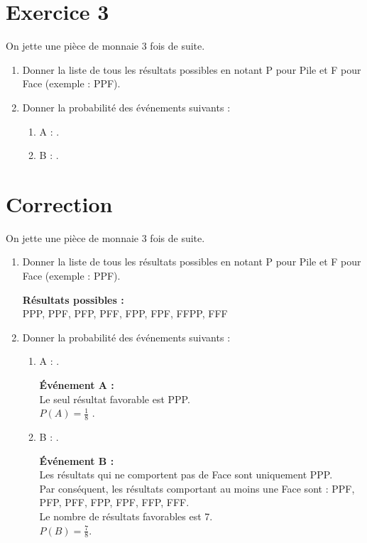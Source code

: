 \documentclass{article}
\begin{document}
\section*{Exercice 3}

On jette une pièce de monnaie 3 fois de suite.

\begin{enumerate}
    \item Donner la liste de tous les résultats possibles en notant P pour Pile et F pour Face (exemple : PPF).
    \item Donner la probabilité des événements suivants :
    \begin{enumerate}
        \item A : .
        \item B : .
    \end{enumerate}
\end{enumerate}

\section*{Correction}

On jette une pièce de monnaie 3 fois de suite.

\begin{enumerate}
    \item Donner la liste de tous les résultats possibles en notant P pour Pile et F pour Face (exemple : PPF).
    
    \textbf{Résultats possibles :} \\
    PPP, PPF, PFP, PFF, FPP, FPF, FFPP, FFF

    \item Donner la probabilité des événements suivants :
    \begin{enumerate}
        \item A : .
        
        \textbf{Événement A :} \\
        Le seul résultat favorable est PPP. \\
         $P(A) = \frac{1}{8}$ .

        \item B : .
        
        \textbf{Événement B :} \\
        Les résultats qui ne comportent pas de Face sont uniquement PPP. \\
        Par conséquent, les résultats comportant au moins une Face sont : PPF, PFP, PFF, FPP, FPF, FFP, FFF. \\
        Le nombre de résultats favorables est 7. \\
         $P(B) = \frac{7}{8}$.
    \end{enumerate}
\end{enumerate}
\end{document}
